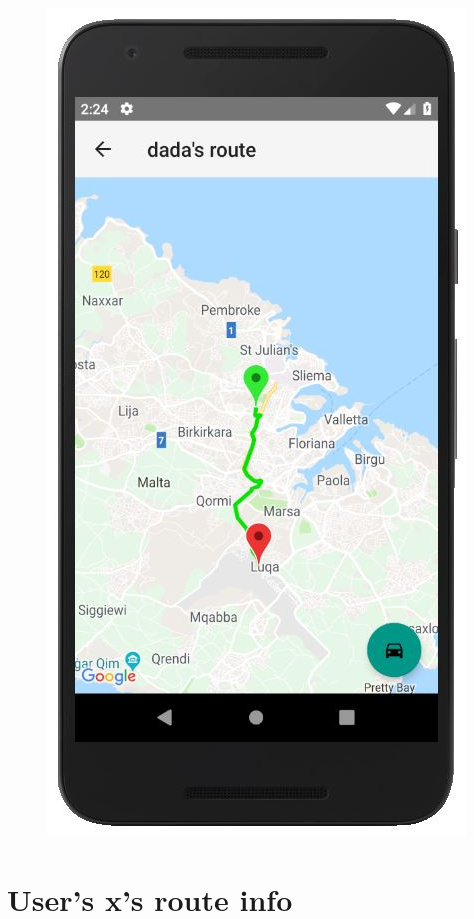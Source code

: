 \begin{figure}[h!]
\begin{center}
\includegraphics[scale = 0.6]{diagrams/ViewRide_page.jpg} 
\end{center}
\end{figure}

\section{User's x's route info}

